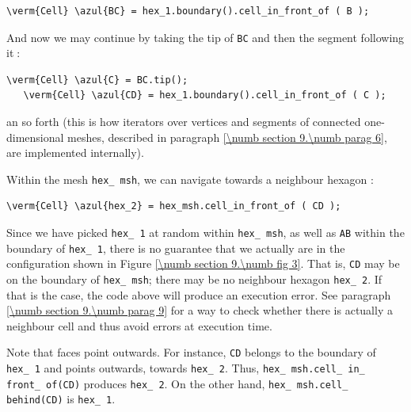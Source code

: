 \begin{Verbatim}[commandchars=\\\{\},formatcom=\small\tt,
   baselinestretch=0.94,framesep=2mm                      ]
   \verm{Cell} \azul{BC} = hex_1.boundary().cell_in_front_of ( B );
\end{Verbatim}

And now we may continue by taking the tip of {\small\tt BC} and then the segment
following it$\;$:

\begin{Verbatim}[commandchars=\\\{\},formatcom=\small\tt,
   baselinestretch=0.94,framesep=2mm                      ]
   \verm{Cell} \azul{C} = BC.tip();
   \verm{Cell} \azul{CD} = hex_1.boundary().cell_in_front_of ( C );
\end{Verbatim}

\noindent an so forth (this is how iterators over vertices and segments of connected
one-dimensional meshes, described in paragraph \ref{\numb section 9.\numb parag 6},
are implemented internally).

Within the mesh {\small\tt hex\_\,msh}, we can navigate towards a neighbour hexagon :

\begin{Verbatim}[commandchars=\\\{\},formatcom=\small\tt,
   baselinestretch=0.94,framesep=2mm                      ]
   \verm{Cell} \azul{hex_2} = hex_msh.cell_in_front_of ( CD );
\end{Verbatim}

Since we have picked {\small\tt hex\_\,1} at random within {\small\tt hex\_\,msh},
as well as {\small\tt AB} within the boundary of {\small\tt hex\_\,1},
there is no guarantee that we actually are in the configuration shown in
Figure \ref{\numb section 9.\numb fig 3}.
That is, {\small\tt CD} may be on the boundary of {\small\tt hex\_\,msh};
there may be no neighbour hexagon {\small\tt hex\_\,2}.
If that is the case, the code above will produce an execution error.
See paragraph \ref{\numb section 9.\numb parag 9} for a way to check whether there is actually
a neighbour cell and thus avoid errors at execution time.

Note that faces point outwards.
For instance, {\small\tt CD} belongs to the boundary of {\small\tt hex\_\,1} and points
outwards, towards {\small\tt hex\_\,2}.
Thus, {\small\tt hex\_\,msh.cell\_\,in\_\,front\_\,of(CD)} produces {\small\tt hex\_\,2}.
On the other hand, {\small\tt hex\_\,msh.cell\_\,behind(CD)} is {\small\tt hex\_\,1}.

